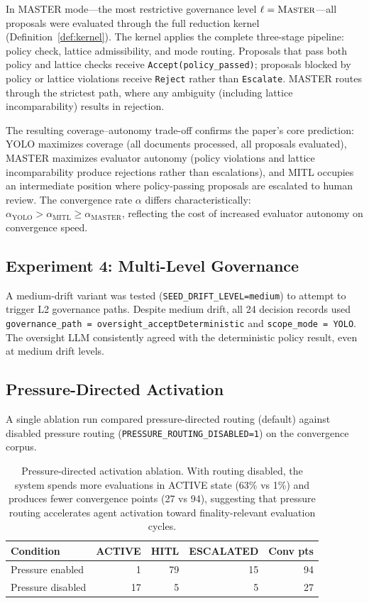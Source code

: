\documentclass[11pt]{article}
\begin{document}
In MASTER mode---the most restrictive governance level $\ell = \textsc{Master}$---all proposals were evaluated through the full reduction kernel (Definition~\ref{def:kernel}). The kernel applies the complete three-stage pipeline: policy check, lattice admissibility, and mode routing. Proposals that pass both policy and lattice checks receive \texttt{Accept(policy\_passed)}; proposals blocked by policy or lattice violations receive \texttt{Reject} rather than \texttt{Escalate}. MASTER routes through the strictest path, where any ambiguity (including lattice incomparability) results in rejection.

The resulting coverage--autonomy trade-off confirms the paper's core prediction: YOLO maximizes coverage (all documents processed, all proposals evaluated), MASTER maximizes evaluator autonomy (policy violations and lattice incomparability produce rejections rather than escalations), and MITL occupies an intermediate position where policy-passing proposals are escalated to human review. The convergence rate $\alpha$ differs characteristically: $\alpha_{\text{YOLO}} > \alpha_{\text{MITL}} \geq \alpha_{\text{MASTER}}$, reflecting the cost of increased evaluator autonomy on convergence speed.

\subsection{Experiment 4: Multi-Level Governance}

A medium-drift variant was tested (\texttt{SEED\_DRIFT\_LEVEL=medium}) to attempt to trigger L2 governance paths. Despite medium drift, all 24 decision records used \texttt{governance\_path = oversight\_acceptDeterministic} and \texttt{scope\_mode = YOLO}. The oversight LLM consistently agreed with the deterministic policy result, even at medium drift levels.

\subsection{Pressure-Directed Activation}

A single ablation run compared pressure-directed routing (default) against disabled pressure routing (\texttt{PRESSURE\_ROUTING\_DISABLED=1}) on the convergence corpus.

\begin{table}[H]
\centering
\small
\begin{tabular}{lrrrr}
\toprule
\textbf{Condition} & \textbf{ACTIVE} & \textbf{HITL} & \textbf{ESCALATED} & \textbf{Conv pts} \\
\midrule
Pressure enabled  & 1  & 79 & 15 & 94 \\
Pressure disabled & 17 & 5  & 5  & 27 \\
\bottomrule
\end{tabular}
\caption{Pressure-directed activation ablation. With routing disabled, the system spends more evaluations in ACTIVE state (63\% vs 1\%) and produces fewer convergence points (27 vs 94), suggesting that pressure routing accelerates agent activation toward finality-relevant evaluation cycles.}
\label{tab:pressure-ablation}
\end{table}
\end{document}
